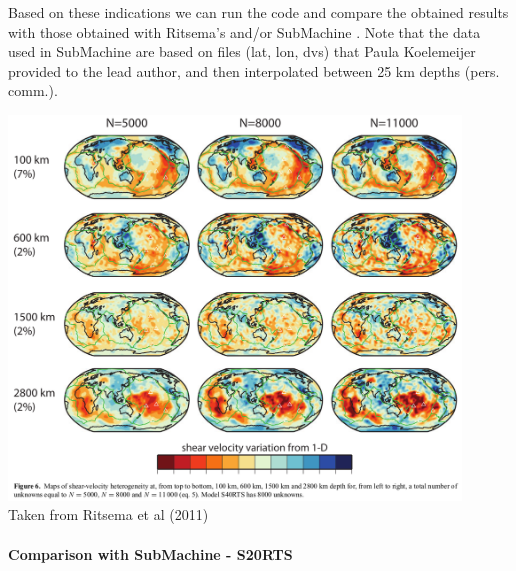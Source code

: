 Based on these indications we can run the code and compare the obtained results 
with those obtained with Ritsema's and/or SubMachine \cite{homs18}.
Note that the data used in SubMachine are based on files (lat, lon, dvs) that 
Paula Koelemeijer provided to the lead author, 
and then interpolated between 25 km depths (pers. comm.).

\begin{center}
\includegraphics[width=12cm]{python_codes/fieldstone_85/images/ridv11}\\
{\captionfont Taken from Ritsema et al (2011) \cite{ridv11}}
\end{center}


\newpage
\paragraph{Comparison with SubMachine - S20RTS}

